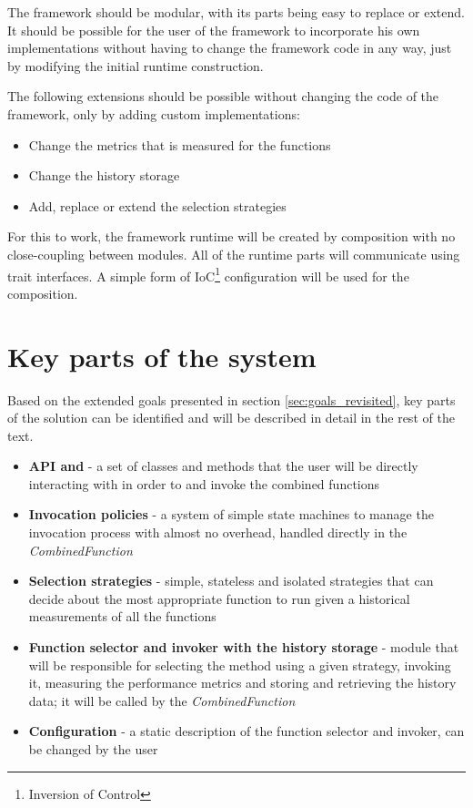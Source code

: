 The framework should be modular, with its parts being easy to replace or extend. It should be possible for the user of the framework to incorporate his own implementations without having to change the framework code in any way, just by modifying the initial runtime construction.

The following extensions should be possible without changing the code of the framework, only by adding custom implementations:

\begin{itemize}
	\item Change the metrics that is measured for the functions
	\item Change the history storage
	\item Add, replace or extend the selection strategies
\end{itemize}

For this to work, the framework runtime will be created by composition with no close-coupling between modules. All of the runtime parts will communicate using trait interfaces. A simple form of IoC\footnote{Inversion of Control} configuration will be used for the composition.

\section{Key parts of the system}

Based on the extended goals presented in section \ref{sec:goals_revisited}, key parts of the solution can be identified and will be described in detail in the rest of the text.

\begin{itemize}
	\item \textbf{API and } - a set of classes and methods that the user will be directly interacting with in order to and invoke the combined functions
	\item \textbf{Invocation policies} - a system of simple state machines to manage the invocation process with almost no overhead, handled directly in the \textit{CombinedFunction}
	\item \textbf{Selection strategies} - simple, stateless and isolated strategies that can decide about the most appropriate function to run given a historical measurements of all the functions
	\item \textbf{Function selector and invoker with the history storage} - module that will be responsible for selecting the method using a given strategy, invoking it, measuring the performance metrics and storing and retrieving the history data; it will be called by the \textit{CombinedFunction}
	\item \textbf{Configuration} - a static description of the function selector and invoker, can be changed by the user
\end{itemize}